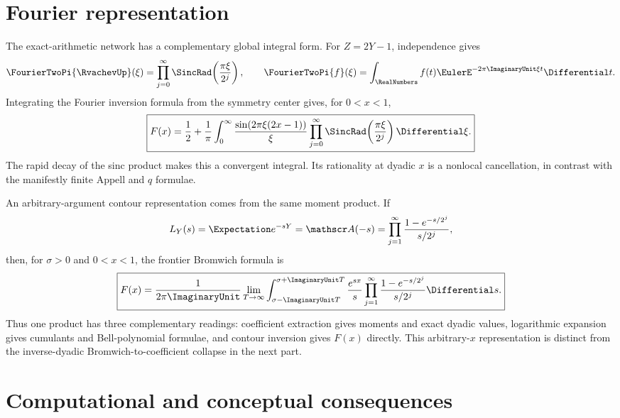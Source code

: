 \documentclass[11pt,oneside]{article}
\theoremstyle{definition}
\theoremstyle{remark}
\begin{document}
\section{Fourier representation}
\label{dyadicweb:sec:fourier-representation}

The exact-arithmetic network has a complementary global integral form.  For
$Z=2Y-1$, independence gives
\begin{equation}
 \FourierTwoPi{\RvachevUp}(\xi)=\prod_{j=0}^{\infty}
 \SincRad\!\left(\frac{\pi\xi}{2^j}\right),
 \qquad
 \FourierTwoPi{f}(\xi)=\int_\RealNumbers
 f(t)\EulerE^{-2\pi\ImaginaryUnit\xi t}\Differential t.
 \label{dyadicweb:eq:up-Fourier}
\end{equation}
Integrating the Fourier inversion formula from the symmetry center gives, for
$0<x<1$,
\begin{equation}
 \boxed{
 F(x)=\frac12+\frac1\pi\int_0^\infty
 \frac{\sin(2\pi\xi(2x-1))}{\xi}
 \prod_{j=0}^{\infty}\SincRad\!\left(\frac{\pi\xi}{2^j}\right)\Differential\xi.}
 \label{dyadicweb:eq:F-Fourier}
\end{equation}
The rapid decay of the sinc product makes this a convergent integral.  Its rationality at
dyadic $x$ is a nonlocal cancellation, in contrast with the manifestly finite Appell and
$q$ formulae.

An arbitrary-argument contour representation comes from the same moment product.  If
\begin{equation}
 L_Y(s)=\Expectation e^{-sY}=\mathscr A(-s)
 =\prod_{j=1}^{\infty}\frac{1-e^{-s/2^j}}{s/2^j},         \label{dyadicq:eq:LX}
\end{equation}
then, for $\sigma>0$ and $0<x<1$, the frontier Bromwich formula is
\begin{equation}
 \boxed{
 F(x)=\frac1{2\pi\ImaginaryUnit}\lim_{T\to\infty}
 \int_{\sigma-\ImaginaryUnit T}^{\sigma+\ImaginaryUnit T}\frac{e^{sx}}s
 \prod_{j=1}^{\infty}\frac{1-e^{-s/2^j}}{s/2^j}\Differential s.} \label{dyadicq:eq:Bromwich}
\end{equation}
Thus one product has three complementary readings: coefficient extraction gives moments and
exact dyadic values, logarithmic expansion gives cumulants and Bell-polynomial formulae, and
contour inversion gives $F(x)$ directly.  This arbitrary-$x$ representation is distinct from
the inverse-dyadic Bromwich-to-coefficient collapse in the next part.

\section{Computational and conceptual consequences}
\label{dyadicweb:sec:consequences}
\end{document}
